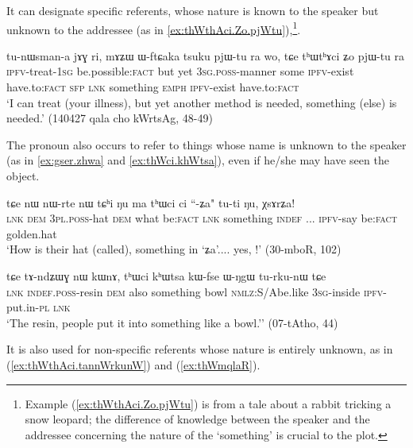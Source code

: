  It can designate specific referents, whose nature is known to the speaker but unknown to the addressee (as in \ref{ex:thWthAci.Zo.pjWtu}),\footnote{Example (\ref{ex:thWthAci.Zo.pjWtu}) is from a tale about a rabbit tricking a snow leopard; the difference of knowledge between the speaker and the addressee concerning the nature of the `something' is crucial to the plot. }.

\begin{exe}
\ex  \label{ex:thWthAci.Zo.pjWtu}
\gll tu-nɯsman-a jɤɣ ri, mɤʑɯ ɯ-ftɕaka tsuku pjɯ-tu ra wo, tɕe tʰɯtʰɤci ʑo pjɯ-tu ra \\
\textsc{ipfv}-treat-\textsc{1sg} be.possible:\textsc{fact} but yet \textsc{3sg.poss}-manner some \textsc{ipfv}-exist have.to:\textsc{fact} \textsc{sfp} \textsc{lnk} something \textsc{emph} \textsc{ipfv}-exist have.to:\textsc{fact} \\
\glt `I can treat (your illness), but yet another method is needed, something (else) is needed.'  (140427 qala cho kWrtsAg, 48-49)
\end{exe}

The pronoun  also occurs to refer to things whose name is unknown to the speaker (as in \ref{ex:gser.zhwa} and \ref{ex:thWci.khWtsa}), even if he/she may have seen the object.
 
\begin{exe}
\ex \label{ex:gser.zhwa}
\gll tɕe nɯ nɯ-rte nɯ tɕʰi ŋu ma tʰɯci ci ``-ʑa" tu-ti ŋu, χsɤrʑa! \\
\textsc{lnk} \textsc{dem} \textsc{3pl.poss}-hat \textsc{dem} what be:\textsc{fact} \textsc{lnk} something \textsc{indef} ... \textsc{ipfv}-say be:\textsc{fact} golden.hat \\
\glt `How is their hat (called), something in `ʑa'.... yes, !' (30-mboR, 102)
\end{exe}

\begin{exe}
\ex \label{ex:thWci.khWtsa}
\gll  tɕe tɤ-ndʑɯɣ nɯ kɯnɤ, tʰɯci kʰɯtsa kɯ-fse ɯ-ŋgɯ tu-rku-nɯ tɕe   \\
\textsc{lnk} \textsc{indef.poss}-resin \textsc{dem} also something bowl \textsc{nmlz}:S/Abe.like \textsc{3sg}-inside \textsc{ipfv}-put.in-\textsc{pl} \textsc{lnk}   \\
\glt `The resin, people put it into something like a bowl.'' (07-tAtho, 44)
\end{exe}

It is also used for non-specific referents whose nature is entirely unknown, as in  (\ref{ex:thWthAci.tannWrkunW}) and (\ref{ex:thWmqlaR}).

